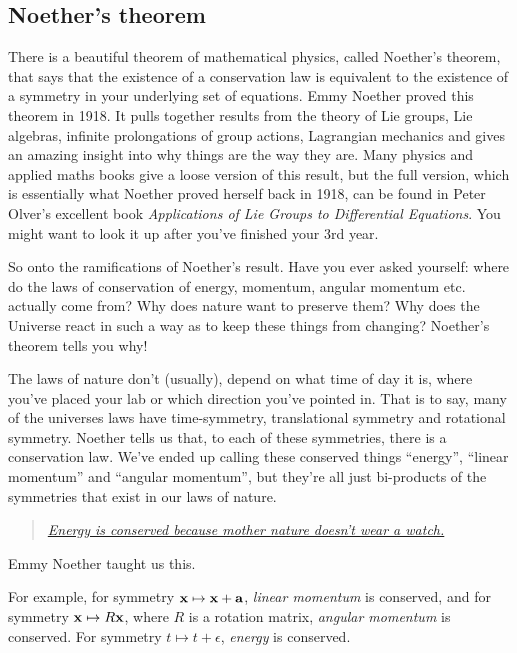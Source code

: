 \subsection{Noether's theorem}
There is a beautiful theorem of mathematical physics, called Noether’s theorem, that says that the existence of a conservation law is equivalent to the existence of a symmetry in your underlying set of equations. Emmy Noether proved this theorem in 1918. It pulls together results from the theory of Lie groups, Lie algebras, infinite prolongations of group actions, Lagrangian mechanics and gives an amazing insight into why things are the way they are. Many physics and applied maths books give a loose version of this result, but the full version, which is essentially what Noether proved herself back in 1918, can be found in Peter Olver’s excellent
book \textit{Applications of Lie Groups to Differential Equations}. You might want to look it up after you’ve finished your 3rd year. 

So onto the ramifications of Noether’s result. Have you ever asked yourself: where do
the laws of conservation of energy, momentum, angular momentum etc. actually come from? Why does nature want to preserve them? Why does the Universe react in such a way as to keep these things from changing? Noether’s theorem tells you why! 

The laws of nature don’t (usually), depend on what time of day it is, where you’ve placed your lab or which direction you’ve pointed in. That is to say, many of the universes laws have time-symmetry, translational symmetry and rotational symmetry. Noether tells
us that, to each of these symmetries, there is a conservation law. We’ve ended up calling these conserved things “energy”, “linear momentum” and “angular momentum”, but they’re all just bi-products of the symmetries that exist in our laws of nature. 
\begin{quote}
    \href{https://en.wikipedia.org/wiki/Noether\%27s_theorem}{\textit{Energy is conserved because mother nature doesn’t wear a watch.}}
\end{quote}
Emmy Noether taught us this.

For example, for symmetry $ {\bf x} \mapsto {\bf x}+{\bf a} $, \textit{linear momentum} is conserved, and for symmetry $ {\bf x} \mapsto R{\bf x} $, where $R$ is a rotation matrix, \textit{angular momentum }is conserved. For symmetry $ t \mapsto t+\epsilon $, \textit{energy} is conserved.